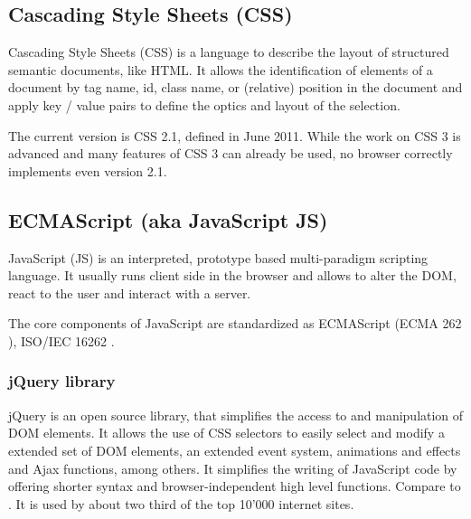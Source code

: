 \subsection{Cascading Style Sheets (CSS)}
\label{sec:css}

Cascading Style Sheets (CSS) is a language to describe the layout of structured semantic documents, like HTML.
It allows the identification of elements of a document by tag name, id, class name, or (relative) position in the document and apply key / value pairs to define the optics and layout of the selection.


The current version is CSS 2.1\cite{css_spec}, defined in June 2011. While the work on CSS 3 is advanced\cite{css_stat} and many features of CSS 3 can already be used\cite{caniuse_css}, no browser correctly implements even version 2.1.


\subsection{ECMAScript (aka JavaScript JS)}
\label{sec:js}
JavaScript (JS) is an interpreted, prototype based multi-paradigm scripting language.
It usually runs client side in the browser and allows to alter the DOM, react to the user and interact with a server.

The core components of JavaScript are standardized as ECMAScript (ECMA 262 \cite{js_std}), ISO/IEC 16262 \cite{js_iso}.


\subsubsection{jQuery library}
\label{sec:jquery}
jQuery is an open source library, that simplifies the access to and manipulation of DOM elements.
It allows the use of CSS selectors to easily select and modify a extended set of DOM elements, an extended event system, animations and effects and Ajax functions, among others.
It simplifies the writing of JavaScript code by offering shorter syntax and browser-independent high level functions.
Compare  to .
It is used by about two third of the top 10'000 internet sites\cite{jquery_usage}.

